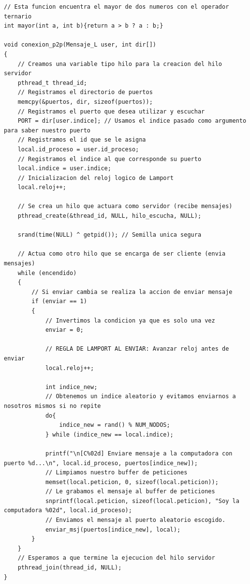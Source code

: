 \begin{lstlisting}[style=estiloC]
// Esta funcion encuentra el mayor de dos numeros con el operador ternario
int mayor(int a, int b){return a > b ? a : b;}

void conexion_p2p(Mensaje_L user, int dir[])
{
    // Creamos una variable tipo hilo para la creacion del hilo servidor
    pthread_t thread_id;
    // Registramos el directorio de puertos
    memcpy(&puertos, dir, sizeof(puertos));
    // Registramos el puerto que desea utilizar y escuchar
    PORT = dir[user.indice]; // Usamos el indice pasado como argumento para saber nuestro puerto
    // Registramos el id que se le asigna
    local.id_proceso = user.id_proceso;
    // Registramos el indice al que corresponde su puerto
    local.indice = user.indice;
    // Inicializacion del reloj logico de Lamport
    local.reloj++; 

    // Se crea un hilo que actuara como servidor (recibe mensajes)
    pthread_create(&thread_id, NULL, hilo_escucha, NULL);
    
    srand(time(NULL) ^ getpid()); // Semilla unica segura
    
    // Actua como otro hilo que se encarga de ser cliente (envia mensajes)
    while (encendido)
    {
        // Si enviar cambia se realiza la accion de enviar mensaje
        if (enviar == 1)
        {
            // Invertimos la condicion ya que es solo una vez
            enviar = 0;
            
            // REGLA DE LAMPORT AL ENVIAR: Avanzar reloj antes de enviar
            local.reloj++; 

            int indice_new;
            // Obtenemos un indice aleatorio y evitamos enviarnos a nosotros mismos si no repite
            do{
                indice_new = rand() % NUM_NODOS;
            } while (indice_new == local.indice); 
            
            printf("\n[C%02d] Enviare mensaje a la computadora con puerto %d...\n", local.id_proceso, puertos[indice_new]);
            // Limpiamos nuestro buffer de peticiones
            memset(local.peticion, 0, sizeof(local.peticion));
            // Le grabamos el mensaje al buffer de peticiones
            snprintf(local.peticion, sizeof(local.peticion), "Soy la computadora %02d", local.id_proceso);
            // Enviamos el mensaje al puerto aleatorio escogido.
            enviar_msj(puertos[indice_new], local);
        }
    }
    // Esperamos a que termine la ejecucion del hilo servidor
    pthread_join(thread_id, NULL);
}
\end{lstlisting}


